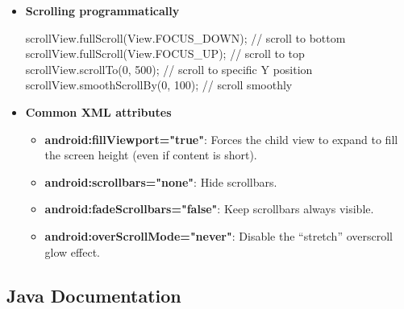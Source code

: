 \documentclass{report}
\begin{document}
\begin{itemize}
\begin{javacode}
            \end{javacode}
        \item \textbf{Scrolling programmatically}
            \bigbreak \noindent 
            \begin{javacode}
                scrollView.fullScroll(View.FOCUS_DOWN); // scroll to bottom
                scrollView.fullScroll(View.FOCUS_UP);   // scroll to top
                scrollView.scrollTo(0, 500);            // scroll to specific Y position
                scrollView.smoothScrollBy(0, 100);      // scroll smoothly
            \end{javacode}
        \item \textbf{Common XML attributes}
            \begin{itemize}
                \item \textbf{android:fillViewport="true"}:	Forces the child view to expand to fill the screen height (even if content is short).
                \item \textbf{android:scrollbars="none"}:	Hide scrollbars.
                \item \textbf{android:fadeScrollbars="false"}:	Keep scrollbars always visible.
                \item \textbf{android:overScrollMode="never"}:	Disable the “stretch” overscroll glow effect.
            \end{itemize}

    \end{itemize}

    \pagebreak 



    \pagebreak 
    \subsection{Java Documentation}
\end{document}
